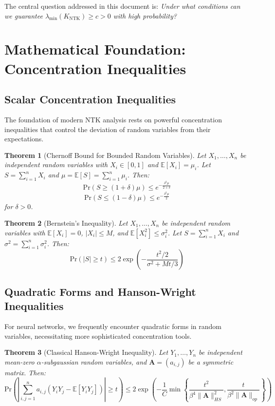\documentclass{article}
\newtheorem{theorem}{Theorem}[section]
\newcommand{\E}{\mathbb{E}}
\newcommand{\Pr}{\text{Pr}}
\newcommand{\KNTK}{K_{\text{NTK}}}
\newcommand{\lambdaMin}{\lambda_{\min}}
\begin{document}
The central question addressed in this document is: \textit{Under what conditions can we guarantee $\lambdaMin(\KNTK) \geq c > 0$ with high probability?}

\section{Mathematical Foundation: Concentration Inequalities}

\subsection{Scalar Concentration Inequalities}

The foundation of modern NTK analysis rests on powerful concentration inequalities that control the deviation of random variables from their expectations.

\begin{theorem}[Chernoff Bound for Bounded Random Variables]
Let $X_1, \ldots, X_n$ be independent random variables with $X_i \in [0,1]$ and $\E[X_i] = \mu_i$. Let $S = \sum_{i=1}^n X_i$ and $\mu = \E[S] = \sum_{i=1}^n \mu_i$. Then:
$$\Pr(S \geq (1+\delta)\mu) \leq e^{-\frac{\delta^2 \mu}{2+\delta}}$$
$$\Pr(S \leq (1-\delta)\mu) \leq e^{-\frac{\delta^2 \mu}{2}}$$
for $\delta > 0$.
\end{theorem}

\begin{theorem}[Bernstein's Inequality]
Let $X_1, \ldots, X_n$ be independent random variables with $\E[X_i] = 0$, $|X_i| \leq M$, and $\E[X_i^2] \leq \sigma_i^2$. Let $S = \sum_{i=1}^n X_i$ and $\sigma^2 = \sum_{i=1}^n \sigma_i^2$. Then:
$$\Pr(|S| \geq t) \leq 2\exp\left(-\frac{t^2/2}{\sigma^2 + Mt/3}\right)$$
\end{theorem}

\subsection{Quadratic Forms and Hanson-Wright Inequalities}

For neural networks, we frequently encounter quadratic forms in random variables, necessitating more sophisticated concentration tools.

\begin{theorem}[Classical Hanson-Wright Inequality]
Let $Y_1, \ldots, Y_n$ be independent mean-zero $\alpha$-subgaussian random variables, and $\mathbf{A} = (a_{i,j})$ be a symmetric matrix. Then:
$$\Pr\left(\left|\sum_{i,j=1}^n a_{i,j}(Y_i Y_j - \E[Y_i Y_j])\right| \geq t\right) \leq 2\exp\left(-\frac{1}{C}\min\left\{\frac{t^2}{\beta^4\|\mathbf{A}\|_{HS}^2}, \frac{t}{\beta^2\|\mathbf{A}\|_{op}}\right\}\right)$$
\end{theorem}
\end{document}
